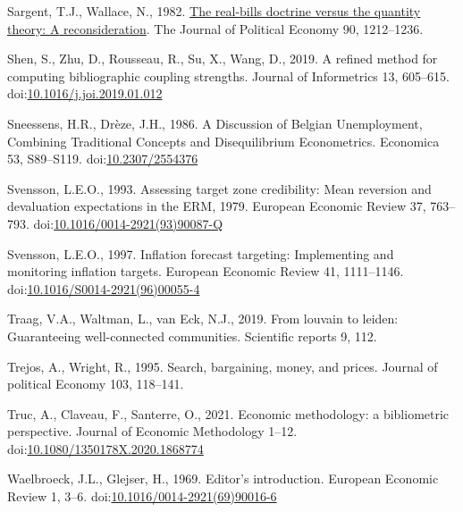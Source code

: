 \documentclass[]{elsarticle} %
\newlength{\cslhangindent}
\newlength{\cslentryspacingunit} %
\newenvironment{CSLReferences}[2] %
 {%
  \setlength{\parindent}{0pt}
  \ifodd #1
  \let\oldpar\par
  \def\par{\hangindent=\cslhangindent\oldpar}
  \fi
  \setlength{\parskip}{#2\cslentryspacingunit}
 }%
 {}
\begin{document}
\begin{CSLReferences}{1}{0}
\leavevmode{}%
Sargent, T.J., Wallace, N., 1982.
\href{http://www.jstor.org/stable/1830945}{The real-bills doctrine
versus the quantity theory: {A} reconsideration}. The Journal of
Political Economy 90, 1212--1236.

\leavevmode{}%
Shen, S., Zhu, D., Rousseau, R., Su, X., Wang, D., 2019. A refined
method for computing bibliographic coupling strengths. Journal of
Informetrics 13, 605--615.
doi:\href{https://doi.org/10.1016/j.joi.2019.01.012}{10.1016/j.joi.2019.01.012}

\leavevmode{}%
Sneessens, H.R., Drèze, J.H., 1986. A {Discussion} of {Belgian
Unemployment}, {Combining Traditional Concepts} and {Disequilibrium
Econometrics}. Economica 53, S89--S119.
doi:\href{https://doi.org/10.2307/2554376}{10.2307/2554376}

\leavevmode{}%
Svensson, L.E.O., 1993. Assessing target zone credibility: {Mean}
reversion and devaluation expectations in the {ERM},
1979. European Economic Review 37, 763--793.
doi:\href{https://doi.org/10.1016/0014-2921(93)90087-Q}{10.1016/0014-2921(93)90087-Q}

\leavevmode{}%
Svensson, L.E.O., 1997. Inflation forecast targeting: {Implementing} and
monitoring inflation targets. European Economic Review 41, 1111--1146.
doi:\href{https://doi.org/10.1016/S0014-2921(96)00055-4}{10.1016/S0014-2921(96)00055-4}

\leavevmode{}%
Traag, V.A., Waltman, L., van Eck, N.J., 2019. From louvain to leiden:
Guaranteeing well-connected communities. Scientific reports 9, 112.

\leavevmode{}%
Trejos, A., Wright, R., 1995. Search, bargaining, money, and prices.
Journal of political Economy 103, 118--141.

\leavevmode{}%
Truc, A., Claveau, F., Santerre, O., 2021. Economic methodology: a
bibliometric perspective. Journal of Economic Methodology 1--12.
doi:\href{https://doi.org/10.1080/1350178X.2020.1868774}{10.1080/1350178X.2020.1868774}

\leavevmode{}%
Waelbroeck, J.L., Glejser, H., 1969. Editor's introduction. European
Economic Review 1, 3--6.
doi:\href{https://doi.org/10.1016/0014-2921(69)90016-6}{10.1016/0014-2921(69)90016-6}

\end{CSLReferences}
\end{document}
